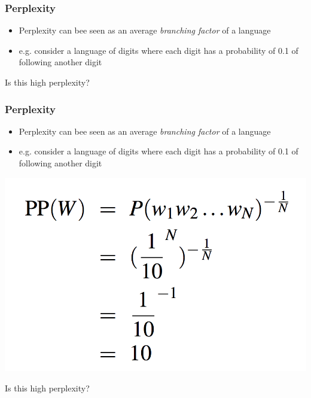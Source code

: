 \documentclass{beamer}
\begin{document}
\begin{frame}
\frametitle{Perplexity}

\begin{itemize}
	\item Perplexity can bee seen as an average {\it branching factor} of a language
	\item e.g. consider a language of digits where each digit has a probability of 0.1 of following another digit
\end{itemize}

\vspace{4cm}

Is this high perplexity?

\end{frame}


\begin{frame}
\frametitle{Perplexity}

\begin{itemize}
\item Perplexity can bee seen as an average {\it branching factor} of a language
\item e.g. consider a language of digits where each digit has a probability of 0.1 of following another digit
\end{itemize}

\includegraphics[height=0.5\textheight]{figures/ppl}

Is this high perplexity?

\end{frame}
\end{document}
